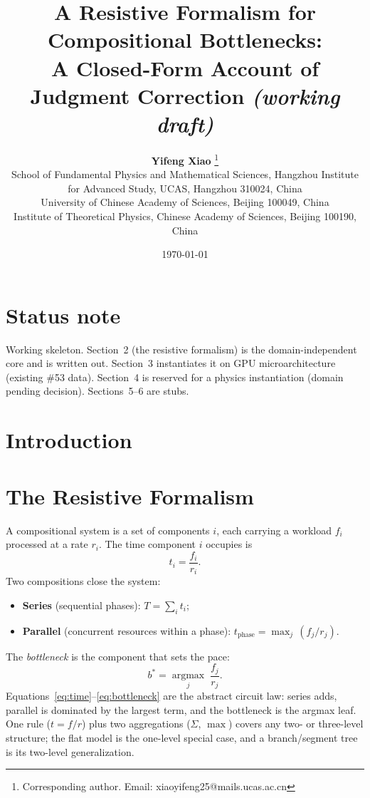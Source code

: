 \documentclass[11pt]{article}
\title{A Resistive Formalism for Compositional Bottlenecks: \\
A Closed-Form Account of Judgment Correction \textit{(working draft)}}
\author{
  \textbf{Yifeng Xiao} \thanks{Corresponding author. Email: xiaoyifeng25@mails.ucas.ac.cn}\\
  School of Fundamental Physics and Mathematical Sciences, Hangzhou Institute for Advanced Study, UCAS, Hangzhou 310024, China\\
  University of Chinese Academy of Sciences, Beijing 100049, China\\
  Institute of Theoretical Physics, Chinese Academy of Sciences, Beijing 100190, China
}
\date{\today}
\begin{document}
\maketitle

\section*{Status note}
Working skeleton. Section~2 (the resistive formalism) is the
domain-independent core and is written out. Section~3 instantiates it on GPU
microarchitecture (existing \#53 data). Section~4 is reserved for a physics
instantiation (domain pending decision). Sections~5--6 are stubs.

\section{Introduction}

\section{The Resistive Formalism}
\label{sec:formalism}

A compositional system is a set of components $i$, each carrying a workload
$f_i$ processed at a rate $r_i$. The time component $i$ occupies is
\begin{equation}
  t_i = \frac{f_i}{r_i}.
  \label{eq:time}
\end{equation}
Two compositions close the system:
\begin{itemize}
  \item \textbf{Series} (sequential phases): $T = \sum_i t_i$;
  \item \textbf{Parallel} (concurrent resources within a phase):
        $t_{\mathrm{phase}} = \max_j\,(f_j/r_j)$.
\end{itemize}
The \emph{bottleneck} is the component that sets the pace:
\begin{equation}
  b^{*} = \operatorname*{argmax}_{j}\; \frac{f_j}{r_j}.
  \label{eq:bottleneck}
\end{equation}
Equations~\eqref{eq:time}--\eqref{eq:bottleneck} are the abstract circuit
law: series adds, parallel is dominated by the largest term, and the
bottleneck is the argmax leaf. One rule ($t=f/r$) plus two aggregations
($\Sigma$, $\max$) covers any two- or three-level structure; the flat model
is the one-level special case, and a branch/segment tree is its two-level
generalization.
\end{document}
